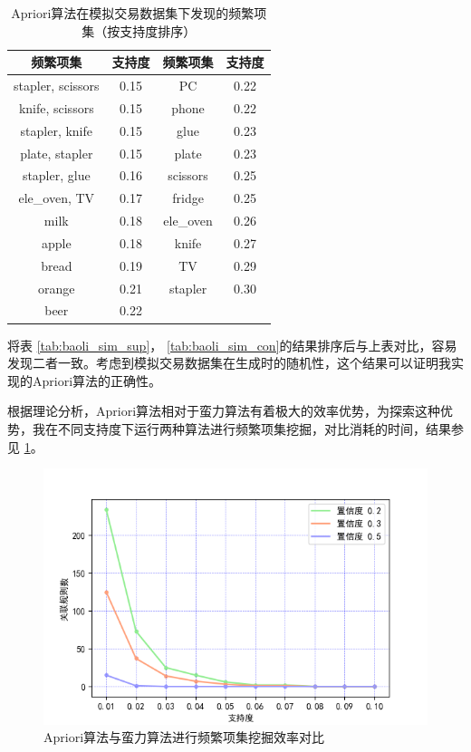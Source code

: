 \documentclass[12pt,a4paper]{article}
\theoremstyle{definition}
\begin{document}
\begin{table}[H]
	\renewcommand\arraystretch{1.35}
	\caption{Apriori算法在模拟交易数据集下发现的频繁项集（按支持度排序）}
	\label{tab:apriori_sim_sup}
	\centering
	
	\begin{tabular}{c|c|c|c}
		\centering
		频繁项集 & 支持度 & 频繁项集 & 支持度 \\
		\hline
		stapler, scissors & 0.15 & PC & 0.22 \\
		knife, scissors & 0.15 & phone & 0.22 \\
		stapler, knife & 0.15 & glue & 0.23 \\
		plate, stapler & 0.15 &plate & 0.23 \\
		stapler, glue & 0.16 & scissors & 0.25 \\
		ele\_oven, TV & 0.17 & fridge & 0.25 \\
		milk & 0.18 & ele\_oven & 0.26 \\
		apple & 0.18 & knife & 0.27 \\
		bread & 0.19 & TV & 0.29 \\
		orange & 0.21 & stapler & 0.30 \\
		beer & 0.22 & & \\		
	\end{tabular}
\end{table}

将表 \ref{tab:baoli_sim_sup}， \ref{tab:baoli_sim_con}的结果排序后与上表对比，容易发现二者一致。考虑到模拟交易数据集在生成时的随机性，这个结果可以证明我实现的Apriori算法的正确性。

根据理论分析，Apriori算法相对于蛮力算法有着极大的效率优势，为探索这种优势，我在不同支持度下运行两种算法进行频繁项集挖掘，对比消耗的时间，结果参见 \ref{fig:time_com}。

\begin{figure}[H]
	\centering
	\includegraphics[width=0.7\linewidth]{img/gro_rule_kline.png}
	\caption{Apriori算法与蛮力算法进行频繁项集挖掘效率对比}
	\label{fig:time_com}
\end{figure}
\end{document}
